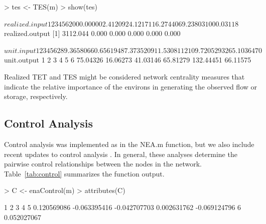 \documentclass[article]{jss}
\begin{document}
\begin{Schunk}
\begin{Sinput}
> tes <- TES(m)
> show(tes)
\end{Sinput}
\begin{Soutput}
$realized.input
         1          2          3          4          5          6 
2000.00000    2.41209   24.12171   16.27440   69.23803 1000.03118 

$realized.output
[1] 3112.044    0.000    0.000    0.000    0.000    0.000

$unit.input
          1           2           3           4           5           6 
289.3658066   0.6561948   7.3735209  11.5308112 109.7205293 265.1036470 

$unit.output
        1         2         3         4         5         6 
 75.04326  16.06273  41.03146  65.81279 132.44451  66.11575 
\end{Soutput}
\end{Schunk}

Realized TET and TES might be considered network centrality measures that
indicate the relative importance of the environs in generating
the observed flow or storage, respectively.

\subsection{Control Analysis}


Control analysis was implemented as in the NEA.m function,
but we also include recent updates to control analysis
\citep[e.g.,][]{schramski06, schramski07}.  In general, these analyses
determine the pairwise control relationships between the nodes in the
network.  Table~\ref{tab:control} summarizes the function output.

\begin{Schunk}
\begin{Sinput}
> C <- enaControl(m)
> attributes(C)
\end{Sinput}
\begin{Soutput}
           1            2            3            4            5 
 0.120569086 -0.063395416 -0.042707703  0.002631762 -0.069124796 
           6 
 0.052027067 
\end{Soutput}
\end{Schunk}
\end{document}
